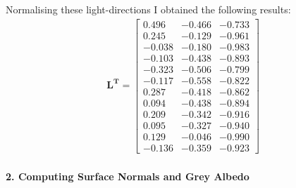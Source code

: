 \documentclass{paper}
\begin{document}
Normalising these light-directions I obtained the following results:
\begin{align}
\mathbf{L^T}= \left[ \begin{array}{ccc}
0.496 & -0.466 & -0.733\\
0.245 & -0.129 & -0.961 \\
-0.038 & -0.180 & -0.983 \\
-0.103 & -0.438 & -0.893 \\
-0.323 & -0.506 & -0.799 \\
-0.117 & -0.558 & -0.822 \\
0.287 & -0.418 & -0.862 \\
0.094 & -0.438 & -0.894 \\
0.209 & -0.342 & -0.916 \\
0.095 & -0.327 & -0.940 \\
0.129 & -0.046 & -0.990 \\
-0.136 & -0.359 & -0.923 
\end{array} \right] \nonumber
\end{align}



\paragraph{2. Computing Surface Normals and Grey Albedo}
\end{document}
